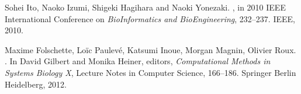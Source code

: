 \begin{frame}[c]
\tcitebullet Sohei Ito, Naoko Izumi, Shigeki Hagihara and Naoki Yonezaki. , in 2010 IEEE International Conference on \textit{BioInformatics and BioEngineering}, 232--237. IEEE, 2010.

\tcitebullet Maxime Folschette, Loïc Paulevé, Katsumi Inoue, Morgan Magnin, Olivier Roux. . In David Gilbert and Monika Heiner, editors, \textit{Computational Methods in Systems Biology X}, Lecture Notes in Computer Science, 166--186. Springer Berlin Heidelberg, 2012.




\vfill
\Large
\begin{flushright}
  \hspace{1cm}~
\end{flushright}
\vfill

~

\end{frame}
